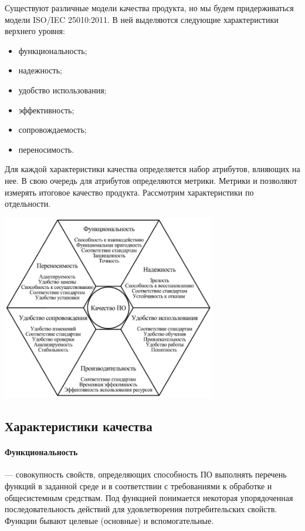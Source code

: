 \documentclass{../../text-style}
\begin{document}
Существуют различные модели качества продукта, но мы будем придерживаться модели ISO/IEC 25010:2011. В ней выделяются следующие характеристики верхнего уровня:

\begin{itemize}
    \item функциональность;
    \item надежность;
    \item удобство использования;
    \item эффективность;
    \item сопровождаемость;
    \item переносимость.
\end{itemize}

Для каждой характеристики качества определяется набор атрибутов, влияющих на нее. В свою очередь для атрибутов определяются метрики. Метрики и позволяют измерять итоговое качество продукта. Рассмотрим характеристики по отдельности.

\begin{center}
    \includegraphics[width=0.7\textwidth]{qualityCharacteristics.png}
\end{center}

\subsection{Характеристики качества}

\paragraph{Функциональность} --- совокупность свойств, определяющих способность ПО выполнять перечень функций в заданной среде и в соответствии с требованиями к обработке и общесистемным средствам. Под функцией понимается некоторая упорядоченная последовательность действий для удовлетворения потребительских свойств. Функции бывают целевые (основные) и вспомогательные.
\end{document}
